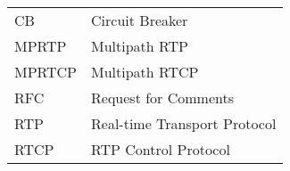 \begin{longtable}{ll}
CB	& Circuit Breaker \\
MPRTP & Multipath RTP \\
MPRTCP & Multipath RTCP \\
RFC & Request for Comments\\
RTP & Real-time Transport Protocol\\
RTCP & RTP Control Protocol\\
\end{longtable}
